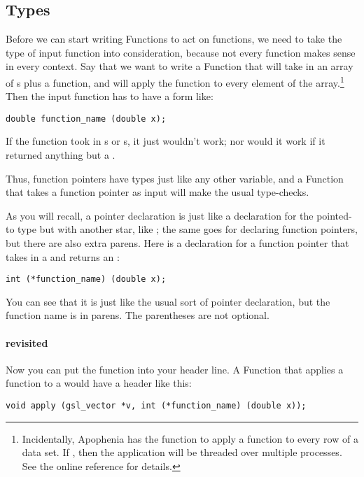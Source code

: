 \subsection{Types} Before we can start writing Functions to act on
functions, we need to take the type of input function into
consideration, because not every function makes sense in every context. Say
that we want to write a Function that will take in an array of
s plus a function, and will apply the function to every
element of the array.\footnote{Incidentally, Apophenia has the
 function to apply a function to every row of
a data set. If , then the
application will be threaded over multiple processes. See the online
reference for details.}
Then the input function has to have a form like:
\begin{lstlisting}
double function_name (double x);
\end{lstlisting}

If the function took in s or s, it just
wouldn't work; nor would it work if it returned anything but a
.

Thus, function pointers have types just like any other variable, and a
Function that takes a function pointer as input will make the usual
type-checks.

As you will recall, a pointer declaration is just like a declaration for the pointed-to type but with
another star, like ; the same goes for declaring function
pointers, but there are also extra parens. Here is a declaration for a
function pointer that takes in a  and returns an :
\begin{lstlisting}
int (*function_name) (double x);
\end{lstlisting}
You can see that it is just like the usual  sort of pointer
declaration, but the function name is in parens.  The parentheses are not
optional.

\paragraph{ revisited}
Now you can put the function into your header line. A Function that
applies a function to a  would have a header like
this:
\begin{lstlisting}
void apply (gsl_vector *v, int (*function_name) (double x));
\end{lstlisting}


